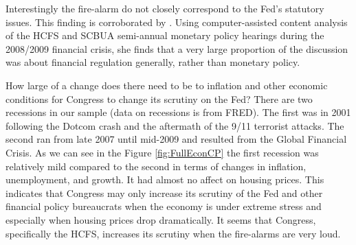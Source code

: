 \documentclass[a4paper]{article}\usepackage[]{graphicx}\usepackage[]{color}
\begin{document}
Interestingly the fire-alarm do not closely correspond to the Fed's statutory issues. This finding is corroborated by \cite{SchonhardtBailey2012}. Using computer-assisted content analysis of the HCFS and SCBUA semi-annual monetary policy hearings during the 2008/2009 financial crisis, she finds that a very large proportion of the discussion was about financial regulation generally, rather than monetary policy.

How large of a change does there need to be to inflation and other economic conditions for Congress to change its scrutiny on the Fed? There are two recessions in our sample (data on recessions is from FRED). The first was in 2001 following the Dotcom crash and the aftermath of the 9/11 terrorist attacks. The second ran from late 2007 until mid-2009 and resulted from the Global Financial Crisis. As we can see in the Figure \ref{fig:FullEconCP} the first recession was relatively mild compared to the second in terms of changes in inflation, unemployment, and growth. It had almost no affect on housing prices. This indicates that Congress may only increase its scrutiny of the Fed and other financial policy bureaucrats when the economy is under extreme stress and especially when housing prices drop dramatically. It seems that Congress, specifically the HCFS, increases its scrutiny when the fire-alarms are very loud.
\end{document}
